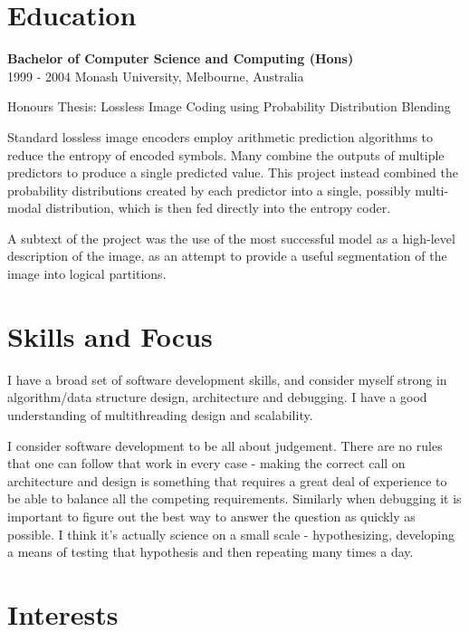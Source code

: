 \documentclass{res}
\begin{document}
\begin{resume}
\section{Education}
\vspace{0.1in} 

    {\bf Bachelor of Computer Science and Computing (Hons)} \\
	1999 - 2004 Monash University, Melbourne, Australia

	Honours Thesis: Lossless Image Coding using Probability Distribution Blending

	Standard lossless image encoders employ arithmetic prediction algorithms to
	reduce the entropy of encoded symbols. Many combine the outputs of multiple
	predictors to produce a single predicted value. This project instead combined
	the probability distributions created by each predictor into a single,
	possibly multi-modal distribution, which is then fed directly into the entropy
	coder.

	A subtext of the project was the use of the most successful model as a
	high-level description of the image, as an attempt to provide a useful
	segmentation of the image into logical partitions.
	 
\section{Skills and Focus} 
\vspace{0.2in} 

I have a broad set of software development skills, and consider myself strong
in algorithm/data structure design, architecture and debugging. I have a good
understanding of multithreading design and scalability.

I consider software development to be all about judgement. There are no rules
that one can follow that work in every case - making the correct call on
architecture and design is something that requires a great deal of experience
to be able to balance all the competing requirements. Similarly when debugging
it is important to figure out the best way to answer the question as quickly
as possible. I think it's actually science on a small scale - hypothesizing,
developing a means of testing that hypothesis and then repeating many times a
day.

\section{Interests}


\end{resume}
\end{document}
